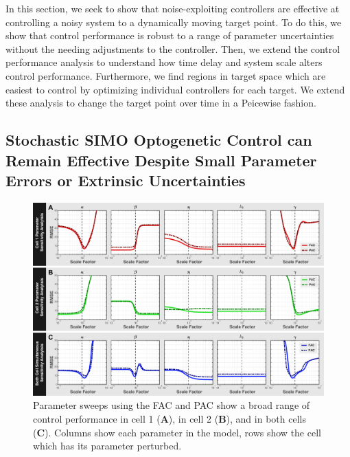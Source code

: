 \documentclass[12pt]{iopart}
\begin{document}

In this section, we seek to show that noise-exploiting controllers are effective at controlling a noisy system to a dynamically moving target point. To do this, we show that control performance is robust to a range of parameter uncertainties without the needing adjustments to the controller. Then, we extend the control performance analysis to understand how time delay and system scale alters control performance. Furthermore, we find regions in target space which are easiest to control by optimizing individual controllers for each target. We extend these analysis to change the target point over time in a Peicewise fashion. 
 \subsection{Stochastic SIMO Optogenetic Control can Remain Effective Despite Small Parameter Errors or Extrinsic Uncertainties}
\begin{figure}
\begin{center}
\includegraphics[width=1\textwidth]{ParameterPerturbation.pdf}
\caption{Parameter sweeps using the FAC and PAC show a broad range of control performance in cell 1 ({\bf A}),  in cell 2 ({\bf B}), and in both cells ({\bf C}). Columns show each parameter in the model, rows show the cell which has its parameter perturbed. }
\label{Parameter}
\end{center}
\end{figure}
\end{document}
